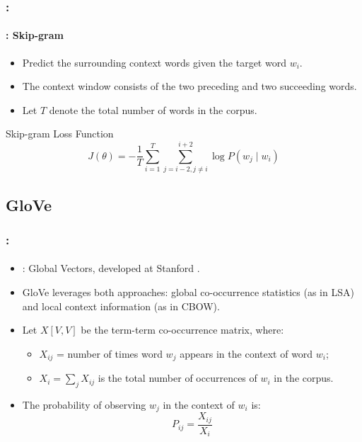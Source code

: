 \documentclass[xcolor=table]{beamer}
\begin{document}
\begin{frame}
	\frametitle{\insertshortsubtitle: \insertsection}
	\framesubtitle{\insertsubsection: Skip-gram}
	
	\begin{minipage}{.58\textwidth}
		\begin{itemize}
			\item Predict the surrounding context words given the target word $w_i$.
			\item The context window consists of the two preceding and two succeeding words.
			\item Let $T$ denote the total number of words in the corpus.
		\end{itemize}
		
		\begin{block}{Skip-gram Loss Function}
			\[
			J(\theta) = -\frac{1}{T} \sum_{i=1}^{T} \sum_{j=i-2, j \ne i}^{i+2} \log P(w_j \mid w_i)
			\]
		\end{block}
		
	\end{minipage}
	\begin{minipage}{.4\textwidth}
	\end{minipage}
	
\end{frame}

\subsection{GloVe}

\begin{frame}
	\frametitle{\insertshortsubtitle: \insertsection}
	\framesubtitle{\insertsubsection}
	
	\begin{itemize}
		\item {}: Global Vectors, developed at Stanford \cite{2014-pennington-al}.
		\item GloVe leverages both approaches: global co-occurrence statistics (as in LSA) and local context information (as in CBOW).
		\item Let $X[V, V]$ be the term-term co-occurrence matrix, where:
		\begin{itemize}
			\item $X_{ij}$ = number of times word $w_j$ appears in the context of word $w_i$;
			\item $X_i = \sum_j X_{ij}$ is the total number of occurrences of $w_i$ in the corpus.
		\end{itemize}
		\item The probability of observing $w_j$ in the context of $w_i$ is:
		\[
		P_{ij} = \frac{X_{ij}}{X_i}
		\]
	\end{itemize}
	

\end{frame}
\end{document}
